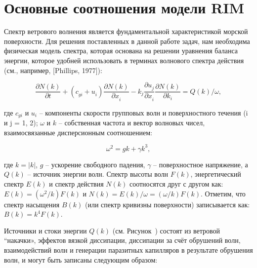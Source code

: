 \appendix



\chapter{Основные соотношения модели RIM} \label{AppendixA}




Спектр ветрового волнения является фундаментальной характеристикой морской поверхности. Для решения поставленных в данной работе задач, нам необходима физическая модель спектра, которая основана на решении уравнения баланса энергии, которое удобней использовать в терминах волнового спектра действия (см., например, [Phillips, 1977]):



\begin{equation} \label{1.29)} \frac{\partial N(k)}{\partial t} +\left(c_{gi}^{} +u_{i}^{} \right)\frac{\partial N(k)}{\partial x_{i}^{} } -k_{j}^{} \frac{\partial u_{j}^{} }{\partial x_{i}^{} } \frac{\partial N(k)}{\partial k_{i}^{} } =Q(k)/\omega , \end{equation} 



\noindent где $c_{gi} $ и $u_{i} $ -- компоненты скорости групповых волн и поверхностного течения (i и j = 1, 2); $\omega $ и $k$ -- собственная частота и вектор волновых чисел, взаимосвязанные дисперсионным соотношением:



\begin{equation} \label{1.30)} \omega _{}^{2} =gk+\gamma k_{}^{3} , \end{equation} 



\noindent где $k=|k|$, $g$ -- ускорение свободного падения, $\gamma $ -- поверхностное напряжение, а $Q(k)$ -- источник энергии волн. Спектр высоты волн $F(k)$, энергетический спектр $E(k)$ и спектр действия $N(k)$ соотносятся друг с другом как: $E(k)=(\omega ^{2} /k)F(k)$ и $N(k)=E(k)/\omega =(\omega /k)F(k)$. Отметим, что спектр насыщения $B(k)$ (или спектр кривизны поверхности) записывается как: $B(k)=k^{4} F(k)$.

Источники и стоки энергии $Q(k)$ (см. Рисунок~) состоят из ветровой ``накачки», эффектов вязкой диссипации, диссипации за счёт обрушений волн, взаимодействий волн и генерации паразитных капилляров в результате обрушения волн, и могут быть записаны следующим образом:



